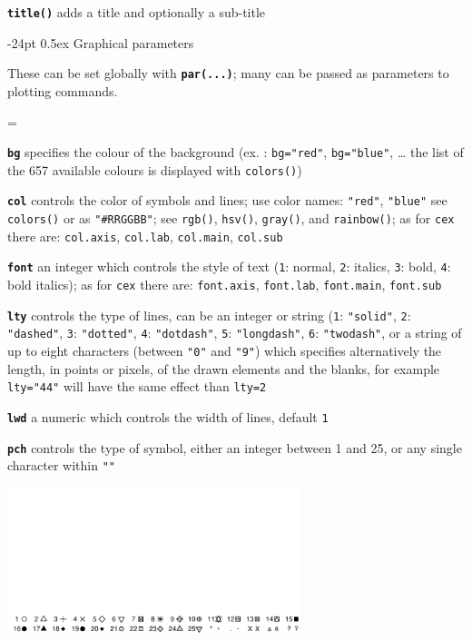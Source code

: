 \documentclass[10pt,landscape]{article}
\makeatletter
\renewcommand\section{\@startsection{section}{1}{0mm}%
                                     {-24pt}%
                                     {0.5ex}%
                                {\color[rgb]{1,0.54902,0}\normalfont\large\bfseries}}
\newcommand{\code}{\texttt}
\newcommand{\bcode}[1]{\texttt{\textbf{#1}}}
\makeatother
\begin{document}
\begin{multicols*}{3}
\bcode{title()}  adds a title and optionally a sub-title




\section{Graphical parameters}

These can be set globally with \bcode{par(...)}; many can be passed as
parameters to plotting commands.

\everypar={\hangindent=9mm}

\bcode{bg}  specifies the colour of the background (ex. : \code{bg="red"}, \code{bg="blue"}, \ldots{} the list of the 657 available colours is displayed with \code{colors()})

\bcode{col}  controls the color of symbols and lines; use color names:
\code{"red"}, \code{"blue"} see \code{colors()} or as \code{"\#RRGGBB"};
see \code{rgb()}, \code{hsv()}, \code{gray()}, and \code{rainbow()}; as for \code{cex} there are: \code{col.axis}, \code{col.lab}, \code{col.main}, \code{col.sub}

\bcode{font}  an integer which controls the style of text (\code{1}: normal, \code{2}: italics, \code{3}: bold, \code{4}: bold italics); as for \code{cex} there are: \code{font.axis}, \code{font.lab}, \code{font.main}, \code{font.sub}

\bcode{lty}  controls the type of lines, can be an integer or string (\code{1}: \code{"solid"}, \code{2}: \code{"dashed"}, \code{3}: \code{"dotted"}, \code{4}: \code{"dotdash"}, \code{5}: \code{"longdash"}, \code{6}: \code{"twodash"}, or a string of up to eight characters (between \code{"0"} and \code{"9"}) which specifies alternatively the length, in points or pixels, of the drawn elements and the blanks, for example \code{lty="44"} will have the same effect than \code{lty=2}

\bcode{lwd}  a numeric which controls the width of lines, default \code{1}

\bcode{pch}  controls the type of symbol, either an integer between 1
and 25, or any single character within \code{""}

\samepage\includegraphics[width=8.5cm]{files/pch_symbol} 







\end{multicols*}
\end{document}
